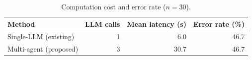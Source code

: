 \begin{table}[H]
\centering
\caption{Computation cost and error rate ($n = 30$).}
\label{tab:cost}
\small
\begin{tabular}{@{}lrrr@{}}
\toprule
Method & LLM calls & Mean latency (s) & Error rate (\%) \\
\midrule
Single-LLM (existing) & 1 & 6.0 & 46.7 \\
Multi-agent (proposed) & 3 & 30.7 & 46.7 \\
\bottomrule
\end{tabular}
\end{table}
